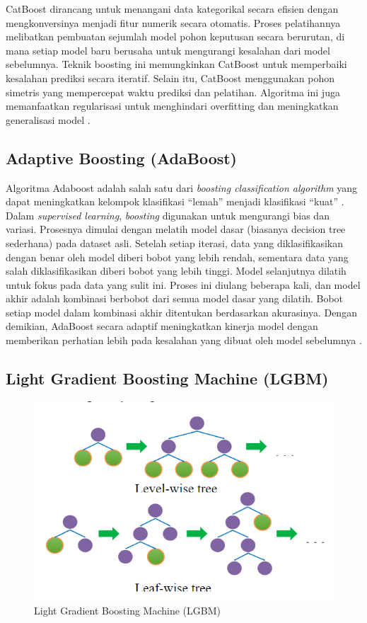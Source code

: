 \documentclass[conference]{IEEEtran}
\begin{document}
CatBoost dirancang untuk menangani data kategorikal secara efisien dengan mengkonversinya menjadi fitur numerik secara otomatis. Proses pelatihannya 
melibatkan pembuatan sejumlah model pohon keputusan secara berurutan, di mana setiap model baru berusaha untuk mengurangi kesalahan dari model sebelumnya. 
Teknik boosting ini memungkinkan CatBoost untuk memperbaiki kesalahan prediksi secara iteratif. Selain itu, CatBoost menggunakan pohon simetris yang mempercepat 
waktu prediksi dan pelatihan. Algoritma ini juga memanfaatkan regularisasi untuk menghindari overfitting dan meningkatkan generalisasi model \cite{b29}.

\subsection{Adaptive Boosting (AdaBoost)}
Algoritma Adaboost adalah salah satu dari \textit{boosting classification algorithm} yang dapat meningkatkan kelompok klasifikasi “lemah” menjadi klasifikasi “kuat” \cite{b33}. 
Dalam \textit{supervised learning}, \textit{boosting} digunakan untuk mengurangi bias dan variasi.
Prosesnya dimulai dengan melatih model dasar (biasanya decision tree sederhana) pada dataset asli. Setelah setiap iterasi, data yang diklasifikasikan dengan benar 
oleh model diberi bobot yang lebih rendah, sementara data yang salah diklasifikasikan diberi bobot yang lebih tinggi. Model selanjutnya dilatih untuk fokus pada 
data yang sulit ini. Proses ini diulang beberapa kali, dan model akhir adalah kombinasi berbobot dari semua model dasar yang dilatih. Bobot setiap model dalam 
kombinasi akhir ditentukan berdasarkan akurasinya. Dengan demikian, AdaBoost secara adaptif meningkatkan kinerja model dengan memberikan perhatian lebih 
pada kesalahan yang dibuat oleh model sebelumnya \cite{b34}.

\subsection{Light Gradient Boosting Machine (LGBM)}

\begin{figure}[htbp]
    \centerline{\includegraphics[width=\linewidth]{LGBM.png}}
    \caption{Light Gradient Boosting Machine (LGBM)}
    \label{lgbm}
\end{figure}
\end{document}
